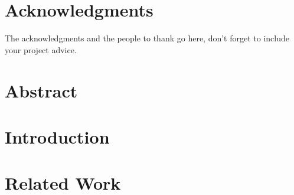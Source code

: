 \documentclass[a4paper,11pt,twoside,openright]{WCarticle}
\begin{document}

\tpage
\pagestyle{plain}

\chapter*{Acknowledgments}
The acknowledgments and the people to thank go here, don't forget to include your project advice. 

\chapter*{Abstract} 


\tableofcontents
\listoffigures
\listoftables
\cleardoublepage
\pagestyle{fancy}

\chapter{Introduction} \label{chap:intro}



\chapter{Related Work} \label{chap:backgrd}



\iffalse
\chapter{Preliminaries} \label{chap:prelim}


\chapter{Approach} \label{chap:appr}


\chapter{Implementation} \label{chap:impl}


\chapter{Evaluation} \label{chap:eval}



\chapter{Conclusion} \label{chap:conclusion}

\fi

\end{document}
